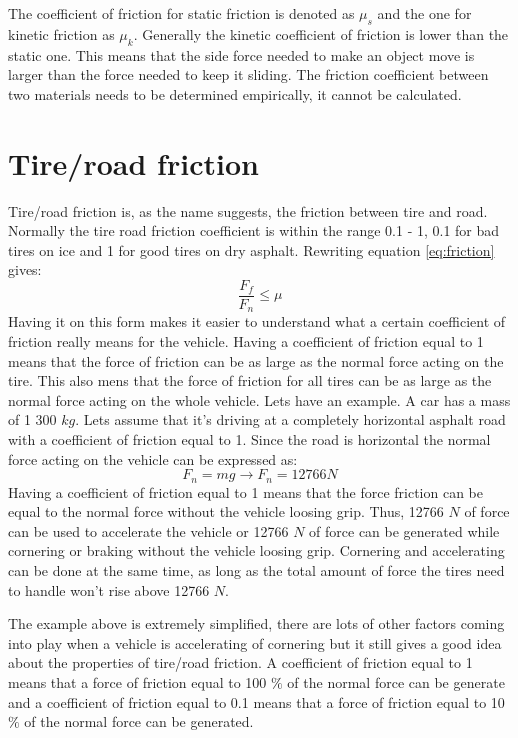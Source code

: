 The coefficient of friction for static friction is denoted as $ \mu_{s} $ and the one for kinetic friction as $ \mu_{k} $. Generally the kinetic coefficient of friction is lower than the static one. This means that the side force needed to make an object move is larger than the force needed to keep it sliding. The friction coefficient between two materials needs to be determined empirically, it cannot be calculated. 

\section{Tire/road friction}
Tire/road friction is, as the name suggests, the friction between tire and road. Normally the tire road friction coefficient is within the range 0.1 - 1, 0.1 for bad tires on ice and 1 for good tires on dry asphalt. Rewriting equation \ref{eq:friction} gives:
\begin{equation} \label{eq:friction2}
\frac{F_{f}}{F_{n}} \leq\mu
\end{equation}
Having it on this form makes it easier to understand what a certain coefficient of friction really means for the vehicle. Having a coefficient of friction equal to 1 means that the force of friction can be as large as the normal force acting on the tire. This also mens that the force of friction for all tires can be as large as the normal force acting on the whole vehicle. Lets have an example. A car has a mass of 1 300 $ kg $. Lets assume that it's driving at a completely horizontal asphalt road with a coefficient of friction equal to 1. Since the road is horizontal the normal force acting on the vehicle can be expressed as:
\begin{equation} \label{eq:friction3}
F_{n}=mg \rightarrow F_{n} = 12766 N 
\end{equation}
Having a coefficient of friction equal to 1 means that the force friction can be equal to the normal force without the vehicle loosing grip. Thus, 12766 $ N $ of force can be used to accelerate the vehicle or 12766 $ N $ of force can be generated while cornering or braking without the vehicle loosing grip. Cornering and accelerating can be done at the same time, as long as the total amount of force the tires need to handle won't rise above 12766 $ N $.

The example above is extremely simplified, there are lots of other factors coming into play when a vehicle is accelerating of cornering but it still gives a good idea about the properties of tire/road friction. A coefficient of friction equal to 1 means that a force of friction equal to 100 $ \% $ of the normal force can be generate and a coefficient of friction equal to 0.1 means that a force of friction equal to 10 $ \% $ of the normal force can be generated.


